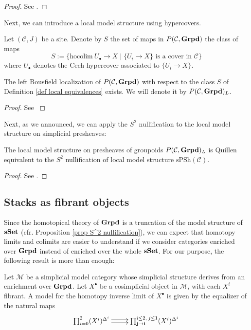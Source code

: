 \begin{refsection}
\begin{proof}
See \cite[Thm. 7.1]{hollander}.
\end{proof}

Next, we can introduce a local model structure using hypercovers.

\begin{defin} \label{def local equivalences}
Let $(\mathcal C,J)$ be a site. Denote by $S$ the set of maps in $P(\mathcal C, \mathbf{Grpd})$ the class of maps
\[
S := \{\mathrm{hocolim} \: U_\bullet \to X \mid \{U_i \to X\} \text{ is a cover in } \mathcal C\} 
\]
where $U_\bullet$ denotes the Cech hypercover associated to $\{U_i \to X\}$.
\end{defin}

\begin{prop}
The left Bousfield localization of $P(\mathcal C, \mathbf{Grpd})$ with respect to the class $S$ of Definition \ref{def local equivalences} exists. We will denote it by $P(\mathcal C,\mathbf{Grpd})_L$.
\end{prop}

\begin{proof}
See \cite[Prop. 7.5]{hollander}
\end{proof}

Next, as we announced, we can apply the $S^2$ nullification to the local model structure on simplicial presheaves:

\begin{thm}
The local model structure on presheaves of groupoids $P(\mathcal C, \mathbf{Grpd})_L$ is Quillen equivalent to the $S^2$ nullification of local model structure $\mathrm{sPSh}(\mathcal C)$.
\end{thm}

\begin{proof}
See \cite[Cor. 8.10]{hollander}.
\end{proof}

\subsection{Stacks as fibrant objects}

Since the homotopical theory of $\mathbf{Grpd}$ is a truncation of the model structure of $\mathbf{sSet}$ (cfr. Proposition \ref{prop S^2 nullification}), we can expect that homotopy limits and colimits are easier to understand if we consider categories enriched over $\mathbf{Grpd}$ instead of enriched over the whole $\mathbf{sSet}$. For our purpose, the following result is more than enough:

\begin{thm}
Let $\mathcal M$ be a simplicial model category whose simplicial structure derives from an enrichment over $\mathbf{Grpd}$. Let $X^\bullet$ be a cosimplicial object in $\mathcal M$, with each $X^i$ fibrant. A model for the homotopy inverse limit of $X^\bullet$ is given by the equalizer of the natural maps
\[
\xymatrix{
\prod_{i = 0}^2 (X^i)^{\Delta^i} \ar@<.5ex>[r] \ar@<-.5ex>[r] & \prod_{\mathbf j \to \mathbf i}^{i \le 2, \: j \le 1} (X^i)^{\Delta^j}
}
\]
\end{thm}


\end{refsection}
